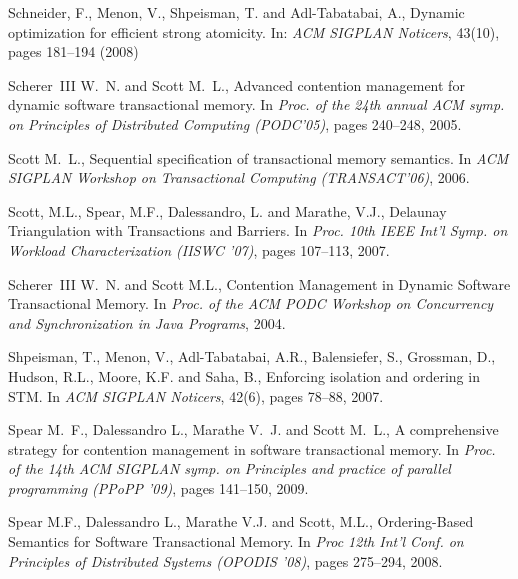 \begin{thebibliography}{99}
{
 Schneider, F., Menon, V., Shpeisman, T. and Adl-Tabatabai, A.,
 Dynamic optimization for efficient strong atomicity.
In: {\it ACM  SIGPLAN Noticers}, 43(10), pages 181--194  (2008)

Scherer~III W.~N. and Scott M.~L.,
\newblock Advanced contention management for dynamic software transactional
  memory.
\newblock In {\em Proc. of the 24th annual ACM
  symp. on Principles of Distributed Computing (PODC'05)}, pages 240--248, 2005.




Scott M.~L.,
\newblock Sequential specification of transactional memory semantics.
\newblock In {\em ACM SIGPLAN Workshop on Transactional Computing (TRANSACT'06)},  2006.



 Scott, M.L.,  Spear, M.F., Dalessandro, L. and   Marathe, V.J.,
\newblock Delaunay Triangulation with Transactions and Barriers. 
\newblock In {\it Proc.  10th IEEE Int'l Symp. on Workload Characterization (IISWC '07)},
 pages 107--113, 2007.

Scherer~III W.~N. and Scott M.L.,
\newblock Contention Management in Dynamic Software Transactional Memory.
\newblock In {\it Proc. of the ACM PODC Workshop on Concurrency and Synchronization in Java Programs}, 2004.

 Shpeisman, T.,  Menon, V.,  Adl-Tabatabai, A.R.,  Balensiefer, S.,  Grossman, D.,
 Hudson, R.L., Moore, K.F. and Saha, B.,
\newblock Enforcing isolation and ordering in STM. 
\newblock In {\it ACM  SIGPLAN Noticers}, 42(6), pages 78--88, 2007.

Spear M.~F., Dalessandro L., Marathe V.~J. and  Scott M.~L.,
\newblock A comprehensive strategy for contention management in software
  transactional memory.
\newblock In {\em Proc. of the 14th ACM SIGPLAN symp. on
  Principles and practice of parallel programming (PPoPP '09)}, pages 141--150, 2009.


Spear M.F.,  Dalessandro L.,  Marathe V.J. and  Scott, M.L.,
\newblock Ordering-Based Semantics for Software Transactional Memory. 
\newblock In {\it Proc  12th Int'l Conf. on Principles of Distributed Systems 
(OPODIS '08)},  pages 275--294, 2008.

}
\end{thebibliography}
